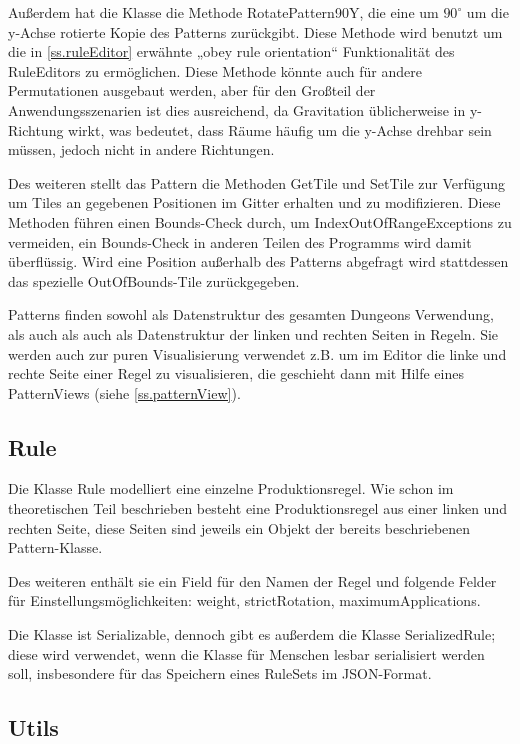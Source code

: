 Außerdem hat die Klasse die Methode RotatePattern90Y, die eine um $ 90^\circ $ um die y-Achse rotierte Kopie des Patterns zurückgibt. Diese Methode wird benutzt um die in \ref{ss.ruleEditor} erwähnte „obey rule orientation“ Funktionalität des RuleEditors zu ermöglichen. Diese Methode könnte auch für andere Permutationen ausgebaut werden, aber für den Großteil der Anwendungsszenarien ist dies ausreichend, da Gravitation üblicherweise in y-Richtung wirkt, was bedeutet, dass Räume häufig um die y-Achse drehbar sein müssen, jedoch nicht in andere Richtungen.

Des weiteren stellt das Pattern die Methoden GetTile und SetTile zur Verfügung um Tiles an gegebenen Positionen im Gitter erhalten und zu modifizieren. Diese Methoden führen einen Bounds-Check durch, um IndexOutOfRangeExceptions zu vermeiden, ein Bounds-Check in anderen Teilen des Programms wird damit überflüssig. Wird eine Position außerhalb des Patterns abgefragt wird stattdessen das spezielle OutOfBounds-Tile zurückgegeben.

Patterns finden sowohl als Datenstruktur des gesamten Dungeons Verwendung, als auch als auch als Datenstruktur der linken und rechten Seiten in Regeln. Sie werden auch zur puren Visualisierung verwendet z.B. um im Editor die linke und rechte Seite einer Regel zu visualisieren, die geschieht dann mit Hilfe eines PatternViews (siehe \ref{ss.patternView}).

\subsection{Rule}

Die Klasse Rule modelliert eine einzelne Produktionsregel. Wie schon im theoretischen Teil beschrieben besteht eine Produktionsregel aus einer linken und rechten Seite, diese Seiten sind jeweils ein Objekt der bereits beschriebenen Pattern-Klasse.

Des weiteren enthält sie ein Field für den Namen der Regel und folgende Felder für Einstellungsmöglichkeiten: weight, strictRotation, maximumApplications.

Die Klasse ist Serializable, dennoch gibt es außerdem die Klasse SerializedRule; diese wird verwendet, wenn die Klasse für Menschen lesbar serialisiert werden soll, insbesondere für das Speichern eines RuleSets im JSON-Format. 

\subsection{Utils}

